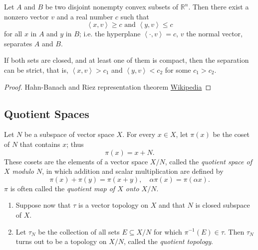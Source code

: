 \begin{theorem}
  \label{theorem-hyperplane-separation}
  Let \( A \) and \( B \) be two disjoint nonempty convex subsets of \( \mathbb{R}^n \).
  Then there exist a nonzero vector \( v \) and a real number \( c \) such that
  \[
    \left\langle x, v \right\rangle \geq c \text{ and } \left\langle y, v \right\rangle \leq c
  \]
  for all \( x \) in \( A \) and \( y \) in \( B \); i.e. the hyperplane \( \left\langle \cdot, v \right\rangle = c \), \( v \) the normal vector, separates \( A \) and \( B \).

  If both sets are closed, and at least one of them is compact, then the separation can be strict, that is, \( \left\langle x, v \right\rangle > c_1 \) and \( \left\langle y, v \right\rangle < c_2 \) for some \( c_1 > c_2 \).
\end{theorem}
\begin{proof}
  Hahn-Banach and Riez representation theorem
  \href{https://en.wikipedia.org/wiki/Hyperplane_separation_theorem}{Wikipedia}
\end{proof}

\subsection{Quotient Spaces}
\label{subsection-quotient-spaces}

\begin{definition}
  \label{definition-quotient-space}
  \label{definition-quotient-map}
  \label{definition-quotient-topology}
  Let \( N \) be a subspace of vector space \( X \).
  For every \( x \in X \), let \( \pi(x) \) be the coset of \( N \) that contains \( x \);
  thus
  \[
    \pi(x) = x + N.
  \]
  These cosets are the elements of a vector space \( X / N \), called the \emph{quotient space of \( X \) modulo \( N \)}, in which addition and scalar multiplication are defined by
  \[
    \pi(x) + \pi(y) = \pi(x + y),\quad \alpha \pi(x) = \pi(\alpha x).
  \]
  \( \pi \) is often called the \emph{quotient map of \( X \) onto \( X / N \)}.
  \begin{enumerate}
    \item Suppose now that \( \tau \) is a vector topology on \( X \) and that \( N \) is closed subspace of \( X \).
    \item Let \( \tau_N \) be the collection of all sets \( E \subseteq X / N \) for which \( \pi^{-1}(E) \in \tau \).
          Then \( \tau_N \) turns out to be a topology on \( X / N \), called the \emph{quotient topology}.
  \end{enumerate}
\end{definition}


